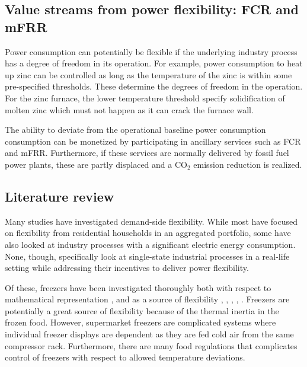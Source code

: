 \documentclass[lettersize,journal]{IEEEtran}
\begin{document}
\subsection{Value streams from power flexibility: FCR and mFRR}

Power consumption can potentially be flexible if the underlying industry process has a  degree of freedom in its operation. For example, power consumption to heat up zinc can be controlled as long as the temperature of the zinc is within some pre-specified thresholds. These determine the degrees of freedom in the operation. For the zinc furnace, the lower temperature threshold specify solidification of molten zinc which must not happen as it can crack the furnace wall.

The ability to deviate from the operational baseline power consumption consumption can be monetized by participating in ancillary services such as FCR and mFRR. Furthermore, if these services are normally delivered by fossil fuel power plants, these are partly displaced and a CO$_{2}$ emission reduction is realized.


\subsection{Literature review}

Many studies have investigated demand-side flexibility. While most have focused on flexibility from residential households in an aggregated portfolio, some have also looked at industry processes with a significant electric energy consumption. None, though, specifically look at single-state industrial processes in a real-life setting while addressing their incentives to deliver power flexibility.

Of these, freezers have been investigated thoroughly both with respect to mathematical representation \cite{shafiei2013modeling}, \cite{pedersen2016improving}  and as a source of flexibility \cite{sossan2016grey}, \cite{o2013modelling}, \cite{de2019leveraging}, \cite{misaghian2022fast}, \cite{vrettos2016fast}. Freezers are potentially a great source of flexibility because of the thermal inertia in the frozen food. However, supermarket freezers are complicated systems where individual freezer displays are dependent as they are fed cold air from the same compressor rack. Furthermore, there are many food regulations that complicates control of freezers with respect to allowed temperature deviations.
\end{document}
